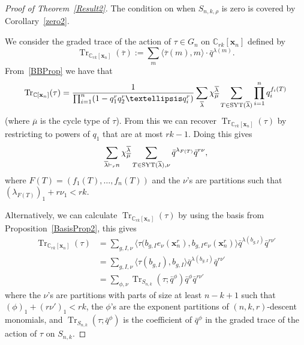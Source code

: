 \documentclass[10pt]{article}
\newcommand{\coloneqq}{:=}
\newcommand{\Tr}{\operatorname{Tr}}\newcommand{\rev}{\operatorname{rev}}
\begin{document}
	\begin{proof}[Proof of Theorem~\ref{Result2}]
		The condition on when $S_{n,k,\rho}$ is zero is covered by Corollary~\ref{zero2}.

		 We consider the graded trace of the action of $\tau\in G_n$ on $\mathbb{C}_{rk}[\mathbf{x}_n]$ defined 
by
\begin{equation}
\Tr _{\mathbb{C}_{rk}[\mathbf{x}_n]}(\overline{\tau})\coloneqq \sum_m \langle \overline{\tau}(m),m\rangle 
\cdot \bar{q}^{\lambda(m)}.
\end{equation}
 From~\ref{BBProp} we have 
that
\begin{equation}
\Tr _{\mathbb{C}[\mathbf{x}_n]}(\tau)=\frac{1}{\prod_{i=1}^n(1-q_1^rq_2^r\ldots 
q_i^r)}\sum_{\overline{\lambda}}\chi_{\overline{\mu}}^{\overline{\lambda}}\sum_{T\in 
\SYT (\overline{\lambda})}\prod_{i=1}^{n} q_i^{f_i(T)}
\end{equation}
 (where $\overline{\mu}$ is the cycle type of $\tau$).
From this we can recover $\Tr _{\mathbb{C}_{rk}[\mathbf{x}_n]}(\tau)$ by restricting to powers of $q_1$ that are at most $rk-1$. 
Doing this gives
\begin{equation}
\sum_{\overline{\lambda}\vdash_r n}\chi_{\overline{\mu}}^{\overline{\lambda}}\sum_{T\in 
\operatorname{SYT} (\overline{\lambda}),\nu}\bar{q}^{\lambda_{F(T)}}\bar{q}^{r\nu},
\end{equation}
 where $F(T)=(f_1(T),\ldots, f_n(T))$ and the 
$\nu$'s are partitions such that $(\lambda_{F(T)})_1+r\nu_1<rk$.

		Alternatively, we can calculate $\Tr _{\mathbb{C}_{rk}[\mathbf{x}_n]}(\tau)$ by using the basis from Proposition~\ref{BasisProp2}, this gives
\begin{align}\Tr _{\mathbb{C}_{rk}[\mathbf{x}_n]}(\tau)&=\sum_{g,I,\nu} \langle \tau(b_{g,I} e_\nu(\mathbf{x}_n^r),b_{g,I} 
e_\nu(\mathbf{x}_n^r) \rangle \bar{q}^{\lambda(b_{g,I})}\bar{q}^{r\nu'}\\
&=\sum_{g,I,\nu} \langle \tau(b_{g,I}),b_{g,I} \rangle \bar{q}^{\lambda(b_{g,I})}\bar{q}^{r\nu'}\\
&=\sum_{\phi,\nu} \Tr _{S_{n,k}}(\tau; \bar{q}^\phi)\bar{q}^{\phi}\bar{q}^{r\nu'}\end{align}
where the $\nu$'s are partitions with parts of size at least $n-k+1$ such that $(\phi)_1+(r\nu')_1<rk$, the $\phi$'s are the 
exponent partitions of $(n,k,r)$-descent monomials, and $\Tr _{S_{n,k}}(\tau;\bar{q}^\phi)$ is the coefficient of $\bar{q}^\phi$ 
in the graded trace of the action of $\tau$ on $S_{n,k}$.


\end{proof}
\end{document}
